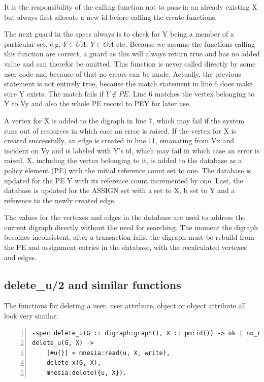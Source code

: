 \documentclass[12pt,a4paper,titlepage]{book}
\begin{document}
	It is the responsibility of the calling function not to pass-in an already existing X but always first allocate a new id before calling the create functions.
	
	The next guard in the specs always is to check for Y being a member of a particular set, e.g. $ Y \in UA $, $ Y \in OA $ etc. Because we assume the functions calling this function are correct, a guard as this will always return true and has no added value and can therefor be omitted. This function is never called directly by some user code and because of that no errors can be made. Actually, the previous statement is not entirely true, because the match statement in line 6 does make sure Y exists. The match fails if $ Y \notin PE $. Line 6 matches the vertex belonging to Y to Vy and also the whole PE record to PEY for later use.
	
	A vertex for X is added to the digraph in line 7, which may fail if the system runs out of resources in which case an error is raised. If the vertex for X is created successfully, an edge is created in line 11, emanating from Vx and incident on Vy and is labeled with Y's id, which may fail in which case an error is raised. X, including the vertex belonging to it, is added to the database as a policy element (PE) with the initial reference count set to one. The database is updated for the PE Y with its reference count incremented by one. Last, the database is updated for the ASSIGN set with a set to X, b set to Y and a reference to the newly created edge.
	
	The values for the vertexes and edges in the database are used to address the current digraph directly without the need for searching. The moment the digraph becomes inconsistent, after a transaction fails, the digraph must be rebuild from the PE and assignment entries in the database, with the recalculated vertexes and edges.
	
	\subsection{delete\_u/2 and similar functions}
	
	The functions for deleting a user, user attribute, object or object attribute all look very similar:
	
	\begin{lstlisting}[caption={delete\_u/2}, basicstyle=\footnotesize, breaklines=false, numbers=left]
-spec delete_u(G :: digraph:graph(), X :: pm:id()) -> ok | no_return().
delete_u(G, X) ->
    [#u{}] = mnesia:read(u, X, write),
    delete_x(G, X),
    mnesia:delete({u, X}). \end{lstlisting}
	
\end{document}
